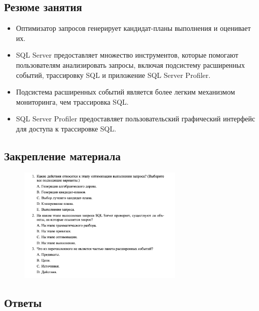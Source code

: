 \subsection*{Резюме занятия}
\begin{itemize}
	\item Оптимизатор запросов генерирует кандидат-планы выполнения и оценивает их. 
	\item SQL Server предоставляет множество инструментов, которые помогают пользователям анализировать запросы, включая подсистему расширенных событий,
	трассировку SQL и приложение SQL Server Profiler. 
	\item Подсистема расширенных событий является более легким механизмом мониторинга, чем трассировка SQL. 
	\item SQL Server Profiler предоставляет пользовательский графический интерфейс для
	доступа к трассировке SQL. 
\end{itemize}

\subsection*{Закрепление материала}

\begin{figure}[h!]
	\begin{center}
		\includegraphics[width=0.7\textwidth]{img/zakrep40.png}
	\end{center}
	\captionsetup{justification=centering}
\end{figure}
\newpage

\subsection*{Ответы}

